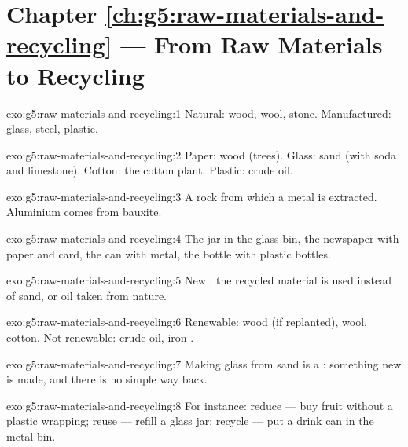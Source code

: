 \section*{Chapter \ref{ch:g5:raw-materials-and-recycling} --- From Raw Materials to Recycling}

\begin{solution}{exo:g5:raw-materials-and-recycling:1}
Natural: wood, wool, stone. Manufactured: glass, steel, plastic.
\end{solution}

\begin{solution}{exo:g5:raw-materials-and-recycling:2}
Paper: wood (trees). Glass: sand (with soda and limestone). Cotton:
the cotton plant. Plastic: crude oil.
\end{solution}

\begin{solution}{exo:g5:raw-materials-and-recycling:3}
A rock from which a metal is extracted. Aluminium comes from bauxite.
\end{solution}

\begin{solution}{exo:g5:raw-materials-and-recycling:4}
The jar in the glass bin, the newspaper with paper and card, the can
with metal, the bottle with plastic bottles.
\end{solution}

\begin{solution}{exo:g5:raw-materials-and-recycling:5}
New : the recycled material is used instead of sand,  or
oil taken from nature.
\end{solution}

\begin{solution}{exo:g5:raw-materials-and-recycling:6}
Renewable: wood (if replanted), wool, cotton. Not renewable: crude oil,
iron .
\end{solution}

\begin{solution}{exo:g5:raw-materials-and-recycling:7}
Making glass from sand is a : something new is made, and
there is no simple way back.
\end{solution}

\begin{solution}{exo:g5:raw-materials-and-recycling:8}
For instance: reduce --- buy fruit without a plastic wrapping; reuse ---
refill a glass jar; recycle --- put a drink can in the metal bin.
\end{solution}

